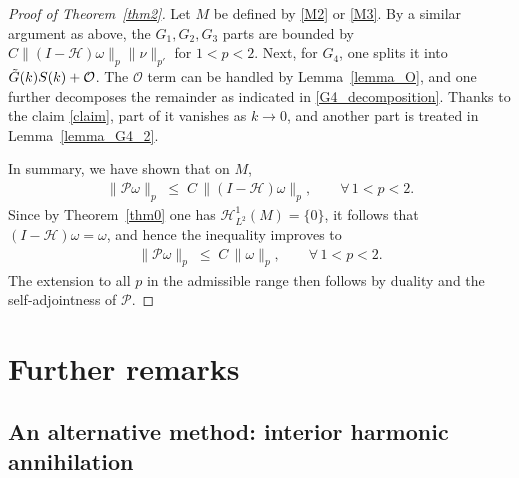 \documentclass[12pt]{amsart}
\begin{document}
\begin{proof}[Proof of Theorem~\ref{thm2}]
Let $M$ be defined by \eqref{M2} or \eqref{M3}. By a similar argument as above, the $G_1, G_2, G_3$ parts are bounded by $C\|(I-\mathcal{H})\omega\|_p \|\nu\|_{p'}$ for $1<p<2$. Next, for $G_4$, one splits it into $\Tilde{G}(k)S(k)+\mathcal{O}$. The $\mathcal{O}$ term can be handled by Lemma~\ref{lemma_O}, and one further decomposes the remainder as indicated in \eqref{G4_decomposition}. Thanks to the claim \eqref{claim}, part of it vanishes as $k\to 0$, and another part is treated in Lemma~\ref{lemma_G4_2}. 

In summary, we have shown that on $M$,
\begin{align*}
    \|\mathcal{P}\omega\|_p \;\le\; C \,\|(I-\mathcal{H})\omega\|_p,
    \qquad \forall\, 1<p<2.
\end{align*}
Since by Theorem~\ref{thm0} one has $\mathcal{H}_{L^2}^1(M)=\{0\}$, it follows that
$(I-\mathcal{H})\omega = \omega$,
and hence the inequality improves to
\begin{align*}
    \|\mathcal{P}\omega\|_p \;\le\; C \,\|\omega\|_p,
    \qquad \forall\, 1<p<2.
\end{align*}
The extension to all $p$ in the admissible range then follows by duality and the self-adjointness of $\mathcal{P}$.


\end{proof}







\section{Further remarks}\label{Sec7}

\subsection{An alternative method: interior harmonic annihilation}
\end{document}
